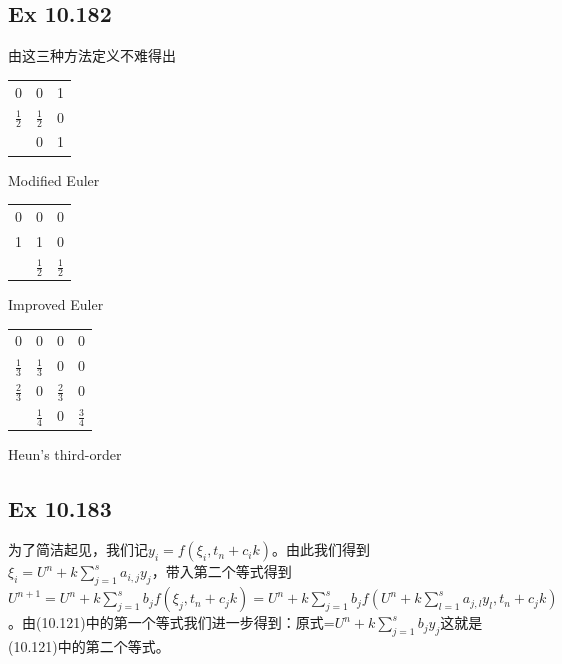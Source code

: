 \documentclass{article}
\begin{document}
\subsection*{Ex 10.182}
\indent 由这三种方法定义不难得出

\begin{minipage}{\textwidth}
\begin{minipage}[t]{0.48\textwidth}
\makeatletter{}
\begin{tabular}{c|c c}
    0 & 0 & 1 \\
    $\frac{1}{2}$ & $\frac{1}{2}$ & 0 \\
    \hline
    & 0 & 1
\end{tabular}
\caption{Modified Euler}
\label{sample-table}
\end{minipage}
\begin{minipage}[t]{0.48\textwidth}
\makeatletter{}
\begin{tabular}{c|c c}
    0 & 0 & 0 \\
    1 & 1 & 0 \\
    \hline
    & $\frac{1}{2}$ & $\frac{1}{2}$
\end{tabular}
\caption{Improved Euler}
\label{sample-table}
\end{minipage}

\begin{minipage}[t]{\textwidth}
\makeatletter{}
\begin{center}
\begin{tabular}{c|c c c}
    0 & 0 & 0 & 0\\
    $\frac{1}{3}$ & $\frac{1}{3}$ & 0 & 0 \\
    $\frac{2}{3}$ & 0 & $\frac{2}{3}$ & 0 \\
    \hline
    & $\frac{1}{4}$ & 0 & $\frac{3}{4}$
\end{tabular}
\end{center}
\caption{Heun's third-order}
\label{sample-table}
\end{minipage}

\end{minipage}

\subsection*{Ex 10.183}
\indent 为了简洁起见，我们记$y_i=f(\xi_i,t_n+c_ik)$。由此我们得到$\xi_i = U^n+k\sum_{j=1}^sa_{i,j}y_j$，带入第二个等式得到$U^{n+1}=U^n+k\sum_{j=1}^sb_jf(\xi_j,t_n+c_jk)=U^n+k\sum_{j=1}^sb_jf(U^n+k\sum_{l=1}^sa_{j,l}y_l,t_n+c_jk)$。由(10.121)中的第一个等式我们进一步得到：原式=$U^n+k\sum_{j=1}^sb_jy_j$这就是(10.121)中的第二个等式。
\end{document}
